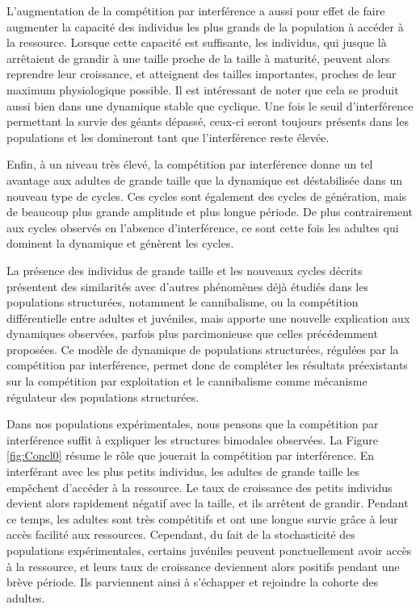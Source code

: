 L'augmentation de la compétition par interférence a aussi pour effet de faire
augmenter la capacité des individus les plus grands de la population à accéder à
la ressource. Lorsque cette capacité est suffisante, les individus, qui jusque
là arrêtaient de grandir à une taille proche de la taille à maturité, peuvent
alors reprendre leur croissance, et atteignent des tailles importantes, proches
de leur maximum physiologique possible. Il est intéressant de noter que cela se
produit aussi bien dans une dynamique stable que cyclique. Une fois le seuil
d'interférence permettant la survie des géants dépassé, ceux-ci seront toujours
présents dans les populations et les domineront tant que l'interférence reste
élevée.

Enfin, à un niveau très élevé, la compétition par interférence donne un tel
avantage aux adultes de grande taille que la dynamique est déstabilisée dans un
nouveau type de cycles. Ces cycles sont également des cycles de génération, mais
de beaucoup plus grande amplitude et plus longue période. De plus contrairement
aux cycles observés en l'absence d'interférence, ce sont cette fois les adultes
qui dominent la dynamique et génèrent les cycles.

La présence des individus de grande taille et les nouveaux cycles décrits
présentent des similarités avec d'autres phénomènes déjà étudiés dans les
populations structurées, notamment le cannibalisme, ou la compétition
différentielle entre adultes et juvéniles, mais apporte une nouvelle explication
aux dynamiques observées, parfois plus parcimonieuse que celles précédemment
proposées. Ce modèle de dynamique de populations structurées, régulées par la
compétition par interférence, permet donc de compléter les résultats
préexistants sur la compétition par exploitation et le cannibalisme comme
mécanisme régulateur des populations structurées.

Dans nos populations expérimentales, nous pensons que la compétition par
interférence suffit à expliquer les structures bimodales observées. La Figure \ref{fig:Concl0} résume
le rôle que jouerait la compétition par interférence. En interférant avec les plus petits
individus, les adultes de grande taille les empêchent d'accéder à la ressource.
Le taux de croissance des petits individus devient alors rapidement négatif avec
la taille, et ils arrêtent de grandir. Pendant ce temps, les adultes sont très
compétitifs et ont une longue survie grâce à leur accès facilité aux ressources.
Cependant, du fait de la stochasticité des populations expérimentales, certains
juvéniles peuvent ponctuellement avoir accès à la ressource, et leurs taux de
croissance deviennent alors positifs pendant une brève période. Ils parviennent
ainsi à s'échapper et rejoindre la cohorte des adultes. 

